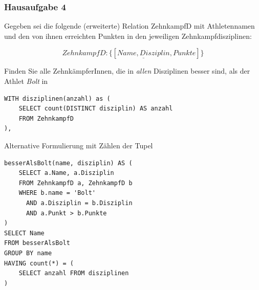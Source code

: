 \begin{frame}[fragile]
	\frametitle{Hausaufgabe 4}
	\vspace{0.25cm}

	\begin{multicols}{2}
		Gegeben sei die folgende (erweiterte) Relation ZehnkampfD mit 
		Athletennamen und den von ihnen erreichten Punkten in den jeweiligen Zehnkampfdisziplinen:

		\[ ZehnkampfD: \{[ \underline{Name, Disziplin}, Punkte ]\} \]

		Finden Sie alle ZehnkämpferInnen, die in \textit{allen} Disziplinen besser sind,
		als der Athlet \textit{Bolt} in
		\begin{verbatim}
WITH disziplinen(anzahl) as (
	SELECT count(DISTINCT disziplin) AS anzahl
	FROM ZehnkampfD
),
		\end{verbatim}
		\vfill\columnbreak
		Alternative Formulierung mit Zählen der Tupel
		\begin{verbatim}
besserAlsBolt(name, disziplin) AS (
	SELECT a.Name, a.Disziplin
	FROM ZehnkampfD a, ZehnkampfD b
	WHERE b.name = 'Bolt'
	  AND a.Disziplin = b.Disziplin
	  AND a.Punkt > b.Punkte
)
SELECT Name 
FROM besserAlsBolt
GROUP BY name
HAVING count(*) = (
	SELECT anzahl FROM disziplinen
)
		\end{verbatim}
	\end{multicols}
\end{frame}
